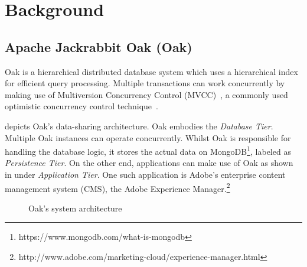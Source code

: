 \documentclass[abstracton,12pt]{scrartcl}
\theoremstyle{definition}
\begin{document}
\section{Background}

\subsection{Apache Jackrabbit Oak (Oak)}

Oak is a hierarchical distributed database system which uses a
hierarchical index for efficient query processing. Multiple transactions can
work concurrently by making use of
Multiversion Concurrency Control (MVCC)~\cite{GW02}, a commonly used optimistic
concurrency control technique~\cite{TM11}.

 depicts Oak's data-sharing architecture. Oak embodies the
\textit{Database Tier}. Multiple Oak instances can operate concurrently.
Whilst Oak is responsible for handling the database logic, it stores the actual
data on MongoDB\footnote{https://www.mongodb.com/what-is-mongodb}, labeled as
\textit{Persistence Tier}. On the other end, applications can make use of Oak as
shown in  under \textit{Application Tier}.
One such application is Adobe's enterprise content management system (CMS),
the Adobe Experience
Manager.\footnote{http://www.adobe.com/marketing-cloud/experience-manager.html}

\begin{figure}[h]
  \begin{center}
  \end{center}
  \caption{Oak's system architecture}
  \label{fig:architecture}
\end{figure}
\end{document}
